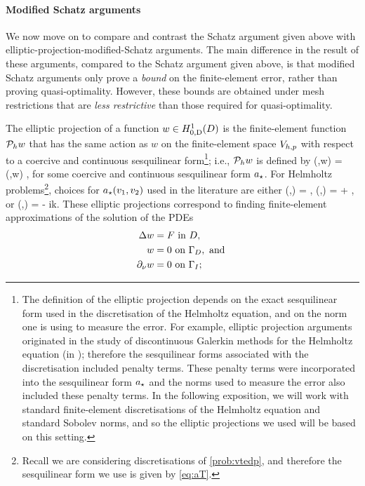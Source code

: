 \paragraph{Modified Schatz arguments} We now move on to compare and contrast the Schatz argument given above with elliptic-projection-modified-Schatz arguments. The main difference in the result of these arguments, compared to the Schatz argument given above, is that modified Schatz arguments only prove a \emph{bound} on the finite-element error, rather than proving quasi-optimality. However, these bounds are obtained under mesh restrictions that are \emph{less restrictive} than those required for quasi-optimality.

The elliptic projection of a function $ w \in \HozDD$ is the finite-element function $\mathcal P_{h} w$ that has the same action as $w$ on the finite-element space $V_{h,p}$ with respect to a coercive and continuous sesquilinear form\footnote{The definition of the elliptic projection depends on the exact sesquilinear form used in the discretisation of the Helmholtz equation, and on the norm one is using to measure the error. For example, elliptic projection arguments originated in the study of discontinuous Galerkin methods for the Helmholtz equation (in \cite{FeWu:09,FeWu:11}); therefore the sesquilinear forms associated with the discretisation included penalty terms. These penalty terms were incorporated into the sesquilinear form $a_{\star}$ and the norms used to measure the error also included these penalty terms. In the following exposition, we will work with standard finite-element discretisations of the Helmholtz equation and standard Sobolev norms, and so the elliptic projections we used will be based on this setting.}; i.e., $\mathcal P_{h} w$ is defined by
\beqs
\aep(\vh,\Ph w) = \aep(\vh,w) \tforall \vh \in \Vhp,
\eeqs
for some coercive and continuous sesquilinear form $a_{\star}$. For Helmholtz problems\footnote{Recall we are considering discretisations of \cref{prob:vtedp}, and therefore the sesquilinear form we use is given by \cref{eq:aT}.}, choices for $a_{\star}(v_{1},v_{2})$ used in the literature are either
\beq\label{eq:aepho}
\aep(\vo,\vt) = \IPLtD{\grad \vo}{\grad \vt},
\eeq
\beq\label{eq:aeplower}
\aep(\vo,\vt) = \IPLtD{\grad \vo}{\grad \vt} + \IPLtD{\vo}{\vt},
\eeq
or
\beq\label{eq:aepused}
\aep(\vo,\vt) = \IPLtD{\grad \vo}{\grad \vt} - ik\IPLtGI{\vo}{\vt}.
\eeq
These elliptic projections correspond to finding finite-element approximations of the solution of the PDEs
\begin{align}
  \Delta w &= F \text{ in } D,\label{eq:sd1}\\
  w &= 0 \text{ on } \Gamma_{D},\text{ and }\label{eq:sd2}\\
  \partial_{\nu} w &= 0 \text{ on } \Gamma_{I}\label{eq:sd3};
\end{align}
